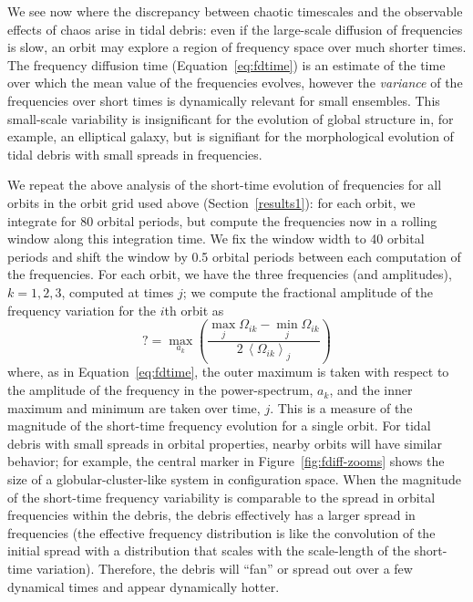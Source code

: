 \documentclass[letterpaper,12pt,preprint]{aastex}
\newcommand{\mean}[1]{\left< #1 \right>}
\begin{document}
We see now where the discrepancy between chaotic timescales and the observable effects of chaos arise in tidal debris: even if the large-scale diffusion of frequencies is slow, an orbit may explore a  region of frequency space over much shorter times. The frequency diffusion time (Equation~\ref{eq:fdtime}) is an estimate of the time over which the mean value of the frequencies evolves, however the \emph{variance} of the frequencies over short times is dynamically relevant for small ensembles. This small-scale variability is insignificant for the evolution of global structure in, for example, an elliptical galaxy, but is signifiant for the morphological evolution of tidal debris with small spreads in frequencies. 

We repeat the above analysis of the short-time evolution of frequencies for all orbits in the orbit grid used above (Section~\ref{results1}): for each orbit, we integrate for 80 orbital periods, but compute the frequencies now in a rolling window along this integration time. We fix the window width to 40 orbital periods and shift the window by 0.5 orbital periods between each computation of the frequencies. For each orbit, we have the three frequencies (and amplitudes), $k=1,2,3$, computed at times $j$; we compute the fractional amplitude of the frequency variation for the $i$th orbit as
\begin{equation}
	? = \max_{a_k} \left(\frac{\max_j \Omega_{ik} - \min_j \Omega_{ik}}{2 \, \mean{\Omega_{ik}}_j}\right) \label{eq:frac-freq-amp}
\end{equation}
where, as in Equation~\ref{eq:fdtime}, the outer maximum is taken with respect to the amplitude of the frequency in the power-spectrum, $a_k$, and the inner maximum and minimum are taken over time, $j$. This is a measure of the magnitude of the short-time frequency evolution for a single orbit. For tidal debris with small spreads in orbital properties, nearby orbits will have similar behavior; for example, the central marker in Figure~\ref{fig:fdiff-zooms} shows the size of a globular-cluster-like system in configuration space. When the magnitude of the short-time frequency variability is comparable to the spread in orbital frequencies within the debris, the debris effectively has a larger spread in frequencies (the effective frequency distribution is like the convolution of the initial spread with a distribution that scales with the scale-length of the short-time variation). Therefore, the debris will ``fan'' or spread out over a few dynamical times and appear dynamically hotter.
\end{document}
